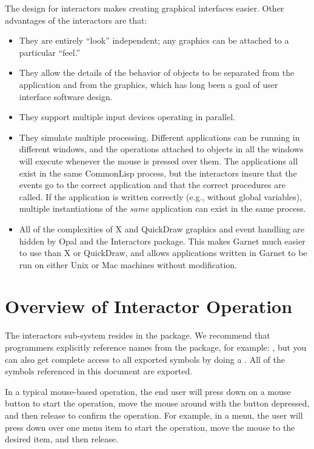 The design for interactors makes creating graphical interfaces
easier.  Other advantages of the interactors are that:
\begin{itemize}
\item They are entirely ``look'' independent; any graphics can be attached to a
particular ``feel.''

\item They allow the details of the behavior of objects to be separated from the
application and from the graphics,
which has long been a goal of user interface software design.

\item They support multiple input devices operating in parallel.

\item They simulate multiple processing.  Different applications can be running
in different windows, and the operations attached to objects in all the
windows will execute whenever the mouse is pressed over them.  The
applications all exist in the same CommonLisp process, but the interactors
insure that the events go to the correct application and that the
correct procedures are called.  If the application is written correctly
(e.g., without global variables), multiple instantiations of the {\it same}
application can exist in the same process.

\item All of the complexities of X and QuickDraw graphics and event handling
are hidden by Opal and the Interactors package.  This makes Garnet
much easier to use than X or QuickDraw, and allows applications written in
Garnet to be run on either Unix or Mac machines without modification.
\end{itemize}


\section{Overview of Interactor Operation}

The interactors sub-system resides in the  package.  We
recommend that programmers explicitly reference names from the
 package, for example: , but you
can also get complete access to all exported symbols by doing a
{\obeyspaces {}}.  All of the symbols referenced in this
document are exported.

In a typical mouse-based operation, the end user will press down on a mouse
button to start the operation, move the mouse around with the button
depressed, and then release to confirm the operation.  For example, in a
menu, the user will press down over one menu item to start the operation,
move the mouse to the desired item, and then release.

